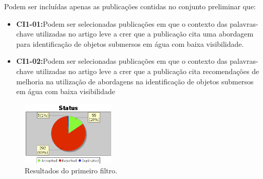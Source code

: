 Podem ser incluídas apenas as publicações contidas no conjunto preliminar que:
\begin{itemize}
	\item \textbf{CI1-01:}Podem ser selecionadas publicações em que o contexto das palavras-chave utilizadas no artigo leve a crer que a publicação cita uma abordagem para identificação de objetos submersos em água com baixa visibilidade.
	\item \textbf{CI1-02:}Podem ser selecionadas publicações em que o contexto das palavras-chave utilizadas no artigo leve a crer que a publicação cita recomendações de melhoria na utilização de abordagens na identificação de objetos submersos em água com baixa visibilidade
\end{itemize}


\begin{figure}[h]
	\caption{\label{fig:stascorr} Resultados do primeiro filtro.}
	\begin{center}
	    \includegraphics[width=0.4\textwidth]{resources/analisecorre}
	\end{center}
\end{figure}
